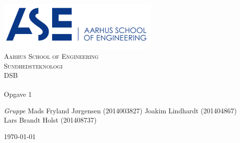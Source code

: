 \begin{titlingpage}
\begin{center}

~ \\[3cm]

\includegraphics[width=0.6\textwidth]{Figurer/ASE}~\\[1cm]

\textsc{\LARGE Aarhus School of Engineering}\\[1.5cm]

\textsc{\Large Sundhedsteknologi}\\
\textsc{\Large DSB }\\[0.5cm]

\noindent\makebox[\linewidth]{\rule{\textwidth}{0.4pt}}\\
[0.5cm]{\Huge Opgave 1}
\noindent\makebox[\linewidth]{\rule{\textwidth}{0.4pt}}

\end{center}

\textit{Gruppe} \newline
Mads Fryland J\o rgensen (2014003827) \newline
Joakim Lindhardt (201404867) \newline
Lars Brandt Holst (201408737)\newline





\vfill

\begin{center}
{\large \today}
\end{center}


\end{titlingpage}